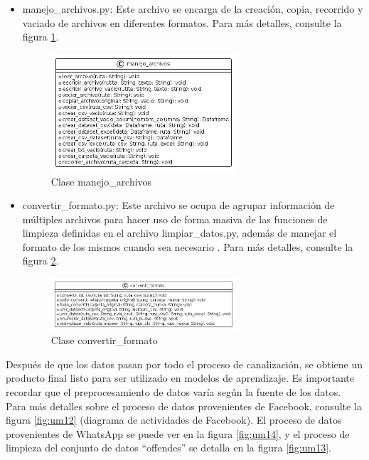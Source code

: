 \begin{itemize}

\item manejo\_archivos.py: Este archivo se encarga de la creación, copia, recorrido y vaciado de archivos en diferentes formatos. Para más detalles, consulte la figura \ref{fig:uml3}.

\begin{figure}
	\includegraphics[width=0.65\textwidth]{capitulo5/figuras/fig3.png}
	\caption{Clase manejo\_archivos}
	\label{fig:uml3}
\end{figure}


\item convertir\_formato.py: Este archivo se ocupa de agrupar información de múltiples archivos para hacer uso de forma masiva de las funciones de limpieza definidas en el archivo limpiar\_datos.py, además de manejar el formato de los mismos cuando sea necesario . Para más detalles, consulte la figura \ref{fig:uml4}.

\begin{figure}
	\includegraphics[width=0.65\textwidth]{capitulo5/figuras/fig4.png}
	\caption{Clase convertir\_formato}
	\label{fig:uml4}
\end{figure}

\end{itemize}

Después de que los datos pasan por todo el proceso de canalización, se obtiene un producto final listo para ser utilizado en modelos de aprendizaje. Es importante recordar que el preprocesamiento de datos varía según la fuente de los datos. Para más detalles sobre el proceso de datos provenientes de Facebook, consulte la figura \ref{fig:um12} (diagrama de actividades de Facebook). El proceso de datos provenientes de WhatsApp se puede ver en la figura \ref{fig:um14}, y el proceso de limpieza del conjunto de datos ``offendes'' se detalla en la figura \ref{fig:um13}.

